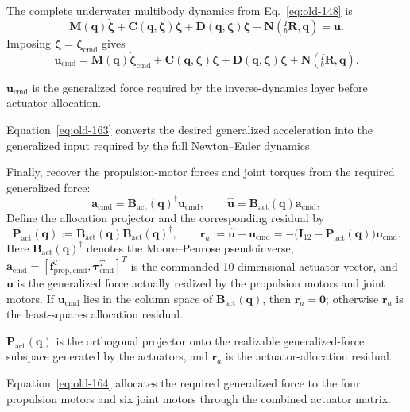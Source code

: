 \documentclass[12pt,a4paper]{report}
\newcommand{\newsymbols}[1]{\par\noindent{}#1\par\vspace{0.35em}}
\newcommand{\formulaannotation}[1]{\par\noindent{}#1\par\vspace{0.35em}}
\begin{document}
The complete underwater multibody dynamics from Eq.~\eqref{eq:old-148} is
\begin{equation}
\mathbf{M}(\mathbf{q})\dot{\boldsymbol{\zeta}} +
\mathbf{C}(\mathbf{q},\boldsymbol{\zeta})\boldsymbol{\zeta} +
\mathbf{D}(\mathbf{q},\boldsymbol{\zeta})\boldsymbol{\zeta} +
\mathbf{N}({}_{b}^{I}\mathbf{R},\mathbf{q}) = \mathbf{u}.
\end{equation}
Imposing $\dot{\boldsymbol{\zeta}} = \dot{\boldsymbol{\zeta}}_{\mathrm{cmd}}$ gives
\begin{equation}
\mathbf{u}_{\mathrm{cmd}} =
\mathbf{M}(\mathbf{q}) \dot{\boldsymbol{\zeta}}_{\mathrm{cmd}} +
\mathbf{C}(\mathbf{q},\boldsymbol{\zeta}) \boldsymbol{\zeta} +
\mathbf{D}(\mathbf{q},\boldsymbol{\zeta}) \boldsymbol{\zeta} +
\mathbf{N}({}_{b}^{I}\mathbf{R},\mathbf{q}).
\label{eq:old-163}
\end{equation}
\newsymbols{$\mathbf{u}_{\mathrm{cmd}}$ is the generalized force required by the inverse-dynamics layer before actuator allocation.}
\formulaannotation{Equation~\eqref{eq:old-163} converts the desired generalized acceleration into the generalized input required by the full Newton--Euler dynamics.}

Finally, recover the propulsion-motor forces and joint torques from the required generalized force:
\begin{equation}
\mathbf{a}_{\mathrm{cmd}} =
\mathbf{B}_{\mathrm{act}}(\mathbf{q})^{\dagger} \mathbf{u}_{\mathrm{cmd}},
\qquad
\hat{\mathbf{u}} =
\mathbf{B}_{\mathrm{act}}(\mathbf{q}) \mathbf{a}_{\mathrm{cmd}},
\label{eq:old-164}
\end{equation}
Define the allocation projector and the corresponding residual by
\begin{equation}
\mathbf{P}_{\mathrm{act}}(\mathbf{q})
:=
\mathbf{B}_{\mathrm{act}}(\mathbf{q})
\mathbf{B}_{\mathrm{act}}(\mathbf{q})^{\dagger},
\qquad
\mathbf{r}_{a}
:=
\hat{\mathbf{u}} - \mathbf{u}_{\mathrm{cmd}}
=
-\bigl(\mathbf{I}_{12} - \mathbf{P}_{\mathrm{act}}(\mathbf{q})\bigr)\mathbf{u}_{\mathrm{cmd}}.
\end{equation}
Here $\mathbf{B}_{\mathrm{act}}(\mathbf{q})^{\dagger}$ denotes the Moore--Penrose pseudoinverse, $\mathbf{a}_{\mathrm{cmd}} = [\mathbf{f}_{\mathrm{prop},\mathrm{cmd}}^T,\boldsymbol{\tau}_{\mathrm{cmd}}^T]^T$ is the commanded 10-dimensional actuator vector, and $\hat{\mathbf{u}}$ is the generalized force actually realized by the propulsion motors and joint motors. If $\mathbf{u}_{\mathrm{cmd}}$ lies in the column space of $\mathbf{B}_{\mathrm{act}}(\mathbf{q})$, then $\mathbf{r}_{a} = \mathbf{0}$; otherwise $\mathbf{r}_{a}$ is the least-squares allocation residual.
\newsymbols{$\mathbf{P}_{\mathrm{act}}(\mathbf{q})$ is the orthogonal projector onto the realizable generalized-force subspace generated by the actuators, and $\mathbf{r}_a$ is the actuator-allocation residual.}
\formulaannotation{Equation~\eqref{eq:old-164} allocates the required generalized force to the four propulsion motors and six joint motors through the combined actuator matrix.}
\end{document}
